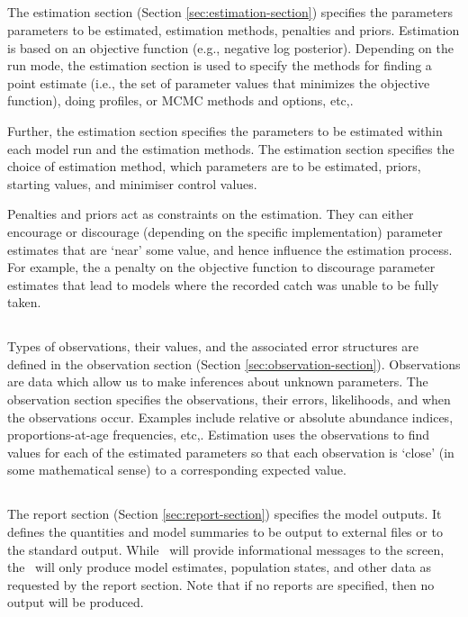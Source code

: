 \subsection{}

The estimation section (Section \ref{sec:estimation-section}) specifies the parameters parameters to be estimated, estimation methods, penalties and priors. Estimation is based on an objective function (e.g., negative log posterior). Depending on the run mode, the estimation section is used to specify the methods for finding a point estimate (i.e., the set of parameter values that minimizes the objective function), doing profiles, or MCMC methods and options, etc,.

Further, the estimation section specifies the parameters to be estimated within each model run and the estimation methods. The estimation section specifies the choice of estimation method, which parameters are to be estimated, priors, starting values, and minimiser control values.

Penalties and priors act as constraints on the estimation. They can either encourage or discourage (depending on the specific implementation) parameter estimates that are `near' some value, and hence influence the estimation process. For example, the a penalty on the objective function to discourage parameter estimates that lead to models where the recorded catch was unable to be fully taken.

\subsection{}

Types of observations, their values, and the associated error structures are defined in the observation section (Section \ref{sec:observation-section}). Observations are data which allow us to make inferences about unknown parameters. The observation section specifies the observations, their errors, likelihoods, and when the observations occur. Examples include relative or absolute abundance indices, proportions-at-age frequencies, etc,. Estimation uses the observations to find values for each of the estimated parameters so that each observation is `close' (in some mathematical sense) to a corresponding expected value. 

\subsection{}

The report section (Section \ref{sec:report-section}) specifies the model outputs. It defines the quantities and model summaries to be output to external files or to the standard output. While \SPM\ will provide informational messages to the screen, the \SPM\ will only produce model estimates, population states, and other data as requested by the report section. Note that if no reports are specified, then no output will be produced.
